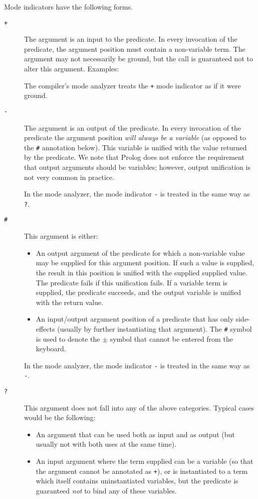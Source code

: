 Mode indicators have the following forms.
\begin{description}
\item[{\tt +}] The argument is an input to the predicate.  In every
  invocation of the predicate, the argument position must contain a
  non-variable term.  The argument may not necessarily be ground, but the
  call is guaranteed not to alter this argument.  Examples:


  The compiler's mode analyzer treats the {\tt +} mode indicator as if
  it were ground.
\item[{\tt -}] The argument is an output of the predicate.  In every
  invocation of the predicate the argument position {\em will always
    be a variable\/} (as opposed to the {\tt \#} annotation below).
  This variable is unified with the value returned by the predicate.
  We note that Prolog does not enforce the requirement that output
  arguments should be variables; however, output unification is not
  very common in practice.


        In the mode analyzer, the mode indicator {\tt -} is treated in
        the same way as {\tt ?}.
\item[{\tt \#}]
	This argument is either:
	\begin{itemize}
	\item	An output argument of the predicate for which a non-variable
		value may be supplied for this argument position.  If such a
		value is supplied, the result in this position is unified with
		the supplied supplied value.  The predicate fails if this
		unification fails.  If a variable term is supplied, the
		predicate succeeds, and the output variable is unified with
		the return value.

	\item	An input/output argument position of a predicate that has
		only side-effects (usually by further instantiating that
		argument).  The {\tt \#} symbol is used to denote the $\pm$
		symbol that cannot be entered from the keyboard.
	\end{itemize}
        In the mode analyzer, the mode indicator {\tt -} is treated in
        the same way as {\tt -}.
\item[{\tt ?}]
	This argument does not fall into any of the above categories. 
        Typical cases would be the following:
	\begin{itemize}
	\item	An argument that can be used both as input and as output
		(but usually not with both uses at the same time).

	\item	An input argument where the term supplied can be a variable
		(so that the argument cannot be annotated as {\tt +}), or is
		instantiated to a term which itself contains uninstantiated
		variables, but the predicate is guaranteed {\em not\/} to
		bind any of these variables.

	\end{itemize}
\end{description}
